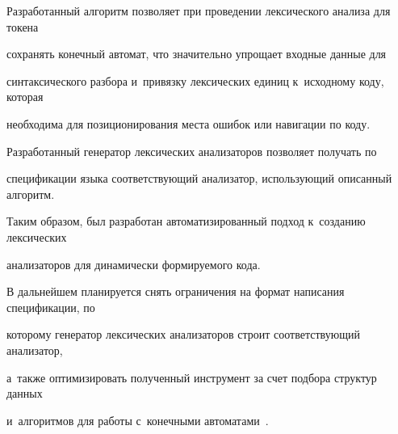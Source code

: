Разработанный алгоритм позволяет при проведении лексического анализа для токена 


сохранять конечный автомат, что значительно упрощает входные данные для 


синтаксического разбора и~привязку лексических единиц к~исходному коду, которая 


необходима для позиционирования места ошибок или навигации по коду. 


Разработанный генератор лексических анализаторов позволяет получать по 


спецификации языка соответствующий анализатор, использующий описанный алгоритм. 


Таким образом, был разработан автоматизированный подход к~созданию лексических 


анализаторов для динамически формируемого кода.





В дальнейшем планируется снять ограничения на формат написания спецификации, по 


которому генератор лексических анализаторов строит соответствующий анализатор, 


а~также оптимизировать полученный инструмент  за счет подбора структур данных 


и~алгоритмов для работы с~конечными ав\-то\-ма\-та\-ми~\cite{AlgoFSA}.


{





}





